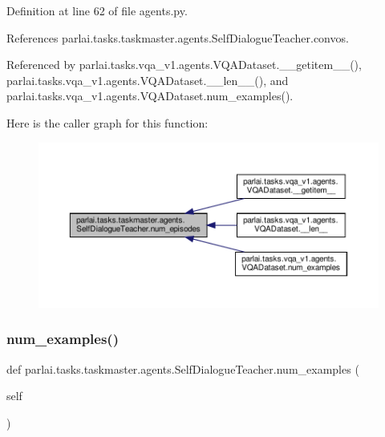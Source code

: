 Definition at line 62 of file agents.\+py.



References parlai.\+tasks.\+taskmaster.\+agents.\+Self\+Dialogue\+Teacher.\+convos.



Referenced by parlai.\+tasks.\+vqa\+\_\+v1.\+agents.\+V\+Q\+A\+Dataset.\+\_\+\+\_\+getitem\+\_\+\+\_\+(), parlai.\+tasks.\+vqa\+\_\+v1.\+agents.\+V\+Q\+A\+Dataset.\+\_\+\+\_\+len\+\_\+\+\_\+(), and parlai.\+tasks.\+vqa\+\_\+v1.\+agents.\+V\+Q\+A\+Dataset.\+num\+\_\+examples().

Here is the caller graph for this function\+:
\nopagebreak
\begin{figure}[H]
\begin{center}
\leavevmode
\includegraphics[width=350pt]{classparlai_1_1tasks_1_1taskmaster_1_1agents_1_1SelfDialogueTeacher_a20da7abc53d7a872ec5346bf81b61593_icgraph}
\end{center}
\end{figure}
\mbox{\label{classparlai_1_1tasks_1_1taskmaster_1_1agents_1_1SelfDialogueTeacher_a9a9b363b5269135be19a3d6607e4bc07}} 
\subsubsection{\texorpdfstring{num\+\_\+examples()}{num\_examples()}}
{\footnotesize\ttfamily def parlai.\+tasks.\+taskmaster.\+agents.\+Self\+Dialogue\+Teacher.\+num\+\_\+examples (\begin{DoxyParamCaption}\item[{}]{self }\end{DoxyParamCaption})}



